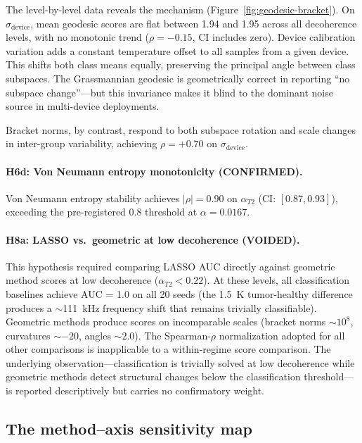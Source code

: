 \documentclass[11pt]{article}
\begin{document}
The level-by-level data reveals the mechanism
(Figure~\ref{fig:geodesic-bracket}).
On $\sigma_\text{device}$, mean geodesic scores are flat between 1.94
and 1.95 across all decoherence levels, with no monotonic trend
($\rho = -0.15$, CI includes zero).
Device calibration variation adds a constant temperature offset to all
samples from a given device.  This shifts both class means equally,
preserving the principal angle between class subspaces.  The
Grassmannian geodesic is geometrically correct in reporting ``no
subspace change''---but this invariance makes it blind to the dominant
noise source in multi-device deployments.

Bracket norms, by contrast, respond to both subspace rotation and
scale changes in inter-group variability, achieving $\rho = +0.70$
on $\sigma_\text{device}$.

\paragraph{H6d: Von Neumann entropy monotonicity (CONFIRMED).}
Von Neumann entropy stability achieves $|\rho| = 0.90$ on
$\alpha_{T2}$ (CI: $[0.87, 0.93]$), exceeding the pre-registered
0.8 threshold at $\alpha = 0.0167$.

\paragraph{H8a: LASSO vs.\ geometric at low decoherence (VOIDED).}
\label{sec:deviation-h8a}
This hypothesis required comparing LASSO AUC directly against geometric
method scores at low decoherence ($\alpha_{T2} < 0.22$).  At these
levels, all classification baselines achieve AUC = 1.0 on all 20 seeds
(the 1.5~K tumor-healthy difference produces a $\sim$111~kHz frequency
shift that remains trivially classifiable).  Geometric methods produce
scores on incomparable scales (bracket norms $\sim 10^8$, curvatures
$\sim -20$, angles $\sim 2.0$).  The Spearman-$\rho$ normalization
adopted for all other comparisons is inapplicable to a within-regime
score comparison.  The underlying observation---classification is
trivially solved at low decoherence while geometric methods detect
structural changes below the classification threshold---is reported
descriptively but carries no confirmatory weight.

\subsection{The method--axis sensitivity map}
\end{document}
